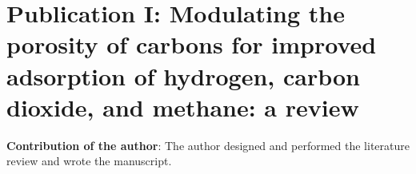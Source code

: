 \newpage
\setcounter{opagenum}{\thepage}
\section[Publication I]{Publication I: Modulating the porosity of carbons for improved adsorption of hydrogen, carbon dioxide, and methane: a review}

\textbf{Contribution of the author}: The author designed and performed the literature review and wrote the manuscript.

\clearpage
\newpage

\setlength{\originalVOffset}{\voffset}   
\setlength{\originalHOffset}{\hoffset}

\setlength{\voffset}{0cm}
\setlength{\hoffset}{0cm}

\setlength{\voffset}{\originalVOffset}
\setlength{\hoffset}{\originalHOffset}

\clearpage



